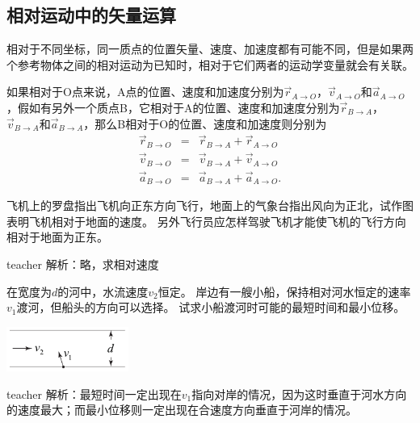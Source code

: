 \subsection{相对运动中的矢量运算}
相对于不同坐标，同一质点的位置矢量、速度、加速度都有可能不同，但是如果两个参考物体之间的相对运动为已知时，相对于它们两者的运动学变量就会有关联。

如果相对于O点来说，A点的位置、速度和加速度分别为$\vec{r}_{A\rightarrow O}$，$\vec{v}_{A\rightarrow O}$和$\vec{a}_{A\rightarrow O}$，假如有另外一个质点B，它相对于A的位置、速度和加速度分别为$\vec{r}_{B\rightarrow A}$，$\vec{v}_{B\rightarrow A}$和$\vec{a}_{B\rightarrow A}$，那么B相对于O的位置、速度和加速度则分别为
\begin{eqnarray}
\vec{r}_{B\rightarrow O}&=&\vec{r}_{B\rightarrow A}+\vec{r}_{A\rightarrow O}\\
\vec{v}_{B\rightarrow O}&=&\vec{v}_{B\rightarrow A}+\vec{v}_{A\rightarrow O}\\
\vec{a}_{B\rightarrow O}&=&\vec{a}_{B\rightarrow A}+\vec{a}_{A\rightarrow O}.
\end{eqnarray}

\begin{example}
飞机上的罗盘指出飞机向正东方向飞行，地面上的气象台指出风向为正北，试作图表明飞机相对于地面的速度。
另外飞行员应怎样驾驶飞机才能使飞机的飞行方向相对于地面为正东。
\begin{taggedblock}{teacher}
\newline
解析：略，求相对速度
\end{taggedblock}
\end{example}


\begin{example}
在宽度为$d$的河中，水流速度$v_2$恒定。
岸边有一艘小船，保持相对河水恒定的速率$v_1$渡河，但船头的方向可以选择。
试求小船渡河时可能的最短时间和最小位移。
\begin{flushright}
\includegraphics[width = 0.3\textwidth]{images/motion-41.pdf} 
\end{flushright}
\begin{taggedblock}{teacher}
\noindent
解析：最短时间一定出现在$v_1$指向对岸的情况，因为这时垂直于河水方向的速度最大；而最小位移则一定出现在合速度方向垂直于河岸的情况。
\end{taggedblock}
\end{example}

